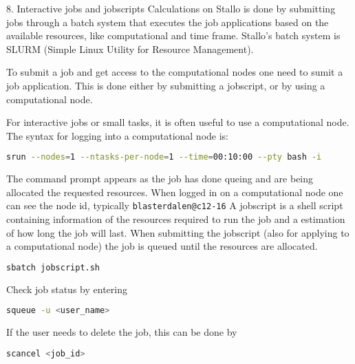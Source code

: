 \documentclass{beamer}
\begin{document}
\begin{frame}[fragile, allowframebreaks=1,t]{8. Interactive jobs and jobscripts}
Calculations on Stallo is done by submitting jobs through a batch system that executes the job applications based on the available resources, like computational and time frame. Stallo's batch system is SLURM (Simple Linux Utility for Resource Management).

To submit a job and get access to the computational nodes one need to sumit a job application. This is done either by submitting a jobscript, or by using a computational node.

For interactive jobs or small tasks,  it is often useful to use a computational node.
The syntax for logging  into a computational node is:
\begin{lstlisting}[backgroundcolor = \color{light-gray}, language=bash]
srun --nodes=1 --ntasks-per-node=1 --time=00:10:00 --pty bash -i
\end{lstlisting}
The command prompt appears as the job has done queing and are being allocated the requested resources. When logged in on a computational node  one can see the node id, typically \texttt{blasterdalen@c12-16}
A jobscript is a shell script containing information of the resources required to run the job and a estimation of how long the job will last. 
When submitting the jobscript (also for applying to a computational node) the job is queued until the resources are allocated. 
\begin{lstlisting}[backgroundcolor = \color{light-gray}, language=bash]
sbatch jobscript.sh
\end{lstlisting}
Check job status by entering
\begin{lstlisting}[backgroundcolor = \color{light-gray}, language=bash]
squeue -u <user_name>
\end{lstlisting}
If the user needs to delete the job, this can be done by 
\begin{lstlisting}[backgroundcolor = \color{light-gray}, language=bash]
scancel <job_id>
\end{lstlisting}
\end{frame}
\end{document}
